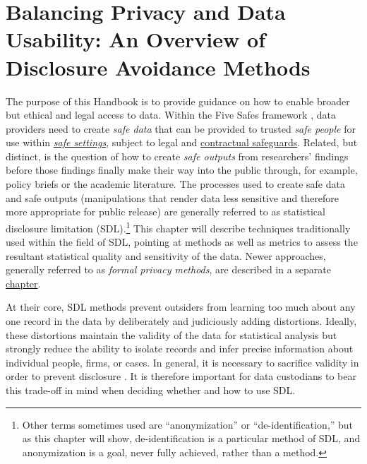 \hypertarget{discavoid}{%
\chapter{Balancing Privacy and Data Usability: An Overview of Disclosure Avoidance Methods}\label{discavoid}}

\hrulefill

The purpose of this Handbook is to provide guidance on how to enable broader but ethical and legal access to data. Within the Five Safes framework \citep{desai2016}, data providers need to create \emph{safe data} that can be provided to trusted \emph{safe people} for use within \emph{\protect\hyperlink{security}{safe settings}}, subject to legal and \protect\hyperlink{dua}{contractual safeguards}. Related, but distinct, is the question of how to create \emph{safe outputs} from researchers' findings before those findings finally make their way into the public through, for example, policy briefs or the academic literature. The processes used to create safe data and safe outputs (manipulations that render data less sensitive and therefore more appropriate for public release) are generally referred to as statistical disclosure limitation (SDL).\footnote{Other terms sometimes used are ``anonymization'' or ``de-identification,'' but as this chapter will show, de-identification is a particular method of SDL, and anonymization is a goal, never fully achieved, rather than a method.} This chapter will describe techniques traditionally used within the field of SDL, pointing at methods as well as metrics to assess the resultant statistical quality and sensitivity of the data. Newer approaches, generally referred to as \emph{formal privacy methods}, are described in a separate \protect\hyperlink{diffpriv}{chapter}.

At their core, SDL methods prevent outsiders from learning too much about any one record in the data \citep{dalenius_towards_1977} by deliberately and judiciously adding distortions. Ideally, these distortions maintain the validity of the data for statistical analysis but strongly reduce the ability to isolate records and infer precise information about individual people, firms, or cases. In general, it is necessary to sacrifice validity in order to prevent disclosure \citep{goroff_balancing_2015, abowd_economic_2015}. It is therefore important for data custodians to bear this trade-off in mind when deciding whether and how to use SDL.

